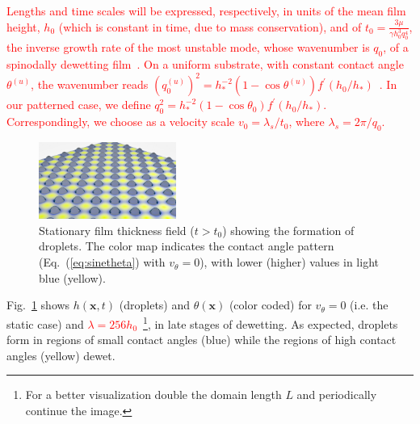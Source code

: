\documentclass[twocolumn,amsmath,amssymb,showpacs,prl,superscriptaddress]{revtex4-1} %
\newcommand{\REV}[1]{\textcolor{red}{#1}}
\begin{document}
\REV{Lengths and time scales will be expressed, respectively, in units of the mean film height, $h_0$ (which is constant in time, due to mass conservation), and of $t_0 = \frac{3\mu}{\gamma h_0^3 q_0^4}$, the inverse growth rate of the most unstable mode, whose wavenumber is $q_0$, of a spinodally dewetting film~\cite{Mecke_2005}. On a uniform substrate, with constant contact angle $\theta^{(u)}$, the wavenumber reads 
$(q^{(u)}_0)^2 = h_{\ast}^{-2}(1-\cos \theta^{(u)})f^{\prime}(h_0/h_{\ast})$~\cite{Mecke_2005,PhysRevE.100.023108}. In our patterned case, we define 
  $q_0^2=h_{\ast}^{-2}(1-\cos\theta_0)f^{\prime}(h_0/h_{\ast})$. Correspondingly, we choose as a velocity scale $v_0 = \lambda_s/t_0$, where
$\lambda_s = 2\pi/q_0$.}
\begin{figure}
    \centering
    \includegraphics[width=0.4\textwidth]{Figure_1.png}
    \caption{Stationary film thickness field ($t>t_0$) showing the formation of droplets. The color map indicates the contact angle pattern 
    (Eq.~(\ref{eq:sinetheta}) with $v_{\theta}=0$), with lower (higher) values in light blue (yellow).
    }
    \label{fig:handtheta}
\end{figure}
Fig.~\ref{fig:handtheta} shows $h(\mathbf{x},t)$ (droplets) and $\theta(\mathbf{x})$ (color coded) for $v_{\theta} = 0$ (i.e. the static case) and \REV{$\lambda = 256 h_0$}~\footnote{For a better visualization double the domain length $L$ and periodically continue the image.}, in late stages of dewetting.
As expected, droplets form in regions of small contact angles (blue) while the regions of high contact angles (yellow) dewet.
\end{document}
